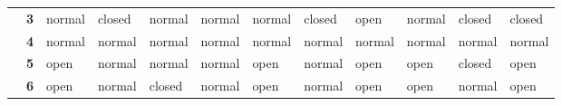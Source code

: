 \documentclass[12pt]{article}
\begin{document}
\begin{table}[]
{\begin{tabular}{clllllllllll}
			\multicolumn{1}{c|}{}                                   & \multicolumn{1}{l|}{\textbf{3}}  & \multicolumn{1}{l|}{\cellcolor[HTML]{FFFC9E}normal} & \multicolumn{1}{l|}{\cellcolor[HTML]{FD6864}closed} & \multicolumn{1}{l|}{\cellcolor[HTML]{FFFC9E}normal} & \multicolumn{1}{l|}{\cellcolor[HTML]{FFFC9E}normal} & \multicolumn{1}{l|}{\cellcolor[HTML]{FFFC9E}normal} & \multicolumn{1}{l|}{\cellcolor[HTML]{FD6864}closed} & \multicolumn{1}{l|}{\cellcolor[HTML]{32CB00}open}   & \multicolumn{1}{l|}{\cellcolor[HTML]{FFFC9E}normal} & \multicolumn{1}{l|}{\cellcolor[HTML]{FD6864}closed} & \multicolumn{1}{l|}{\cellcolor[HTML]{FD6864}closed} \\ \cline{2-12} 
			\multicolumn{1}{c|}{}                                   & \multicolumn{1}{l|}{\textbf{4}}  & \multicolumn{1}{l|}{\cellcolor[HTML]{FFFC9E}normal} & \multicolumn{1}{l|}{\cellcolor[HTML]{FFFC9E}normal} & \multicolumn{1}{l|}{\cellcolor[HTML]{FFFC9E}normal} & \multicolumn{1}{l|}{\cellcolor[HTML]{FFFC9E}normal} & \multicolumn{1}{l|}{\cellcolor[HTML]{FFFC9E}normal} & \multicolumn{1}{l|}{\cellcolor[HTML]{FFFC9E}normal} & \multicolumn{1}{l|}{\cellcolor[HTML]{FFFC9E}normal} & \multicolumn{1}{l|}{\cellcolor[HTML]{FFFC9E}normal} & \multicolumn{1}{l|}{\cellcolor[HTML]{FFFC9E}normal} & \multicolumn{1}{l|}{\cellcolor[HTML]{FFFC9E}normal} \\ \cline{2-12} 
			\multicolumn{1}{c|}{}                                   & \multicolumn{1}{l|}{\textbf{5}}  & \multicolumn{1}{l|}{\cellcolor[HTML]{32CB00}open}   & \multicolumn{1}{l|}{\cellcolor[HTML]{FFFC9E}normal} & \multicolumn{1}{l|}{\cellcolor[HTML]{FFFC9E}normal} & \multicolumn{1}{l|}{\cellcolor[HTML]{FFFC9E}normal} & \multicolumn{1}{l|}{\cellcolor[HTML]{32CB00}open}   & \multicolumn{1}{l|}{\cellcolor[HTML]{FFFC9E}normal} & \multicolumn{1}{l|}{\cellcolor[HTML]{32CB00}open}   & \multicolumn{1}{l|}{\cellcolor[HTML]{32CB00}open}   & \multicolumn{1}{l|}{\cellcolor[HTML]{FD6864}closed} & \multicolumn{1}{l|}{\cellcolor[HTML]{32CB00}open}   \\ \cline{2-12} 
			\multicolumn{1}{c|}{}                                   & \multicolumn{1}{l|}{\textbf{6}}  & \multicolumn{1}{l|}{\cellcolor[HTML]{32CB00}open}   & \multicolumn{1}{l|}{\cellcolor[HTML]{FFFC9E}normal} & \multicolumn{1}{l|}{\cellcolor[HTML]{FD6864}closed} & \multicolumn{1}{l|}{\cellcolor[HTML]{FFFC9E}normal} & \multicolumn{1}{l|}{\cellcolor[HTML]{32CB00}open}   & \multicolumn{1}{l|}{\cellcolor[HTML]{FFFC9E}normal} & \multicolumn{1}{l|}{\cellcolor[HTML]{32CB00}open}   & \multicolumn{1}{l|}{\cellcolor[HTML]{32CB00}open}   & \multicolumn{1}{l|}{\cellcolor[HTML]{FFFC9E}normal} & \multicolumn{1}{l|}{\cellcolor[HTML]{32CB00}open}   \\ \cline{2-12} 

\end{tabular}}
\end{table}
\end{document}
